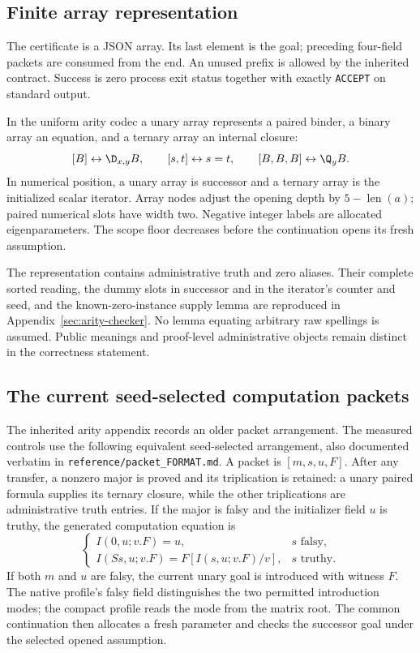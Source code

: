 \subsection{Finite array representation}

The certificate is a JSON array. Its last element is the goal; preceding
four-field packets are consumed from the end. An unused prefix is allowed
by the inherited contract. Success is zero process exit status together
with exactly \texttt{ACCEPT} on standard output.

In the uniform arity codec a unary array represents a paired binder,
a binary array an equation, and a ternary array an internal closure:
\[
 [B]\leftrightarrow\D_{x,y}B,\qquad
 [s,t]\leftrightarrow s=t,\qquad
 [B,B,B]\leftrightarrow\Q_yB.
\]
In numerical position, a unary array is successor and a ternary array is
the initialized scalar iterator. Array nodes adjust the opening depth by
$5-\operatorname{len}(a)$; paired numerical slots have width two.
Negative integer labels are allocated eigenparameters. The scope floor
decreases before the continuation opens its fresh assumption.

The representation contains administrative truth and zero aliases.
Their complete sorted reading, the dummy slots in successor and in the
iterator's counter and seed, and the known-zero-instance supply lemma
are reproduced in Appendix~\ref{sec:arity-checker}. No lemma equating
arbitrary raw spellings is assumed. Public meanings and proof-level
administrative objects remain distinct in the correctness statement.

\subsection{The current seed-selected computation packets}

The inherited arity appendix records an older packet arrangement. The
measured controls use the following equivalent seed-selected arrangement,
also documented verbatim in \texttt{reference/packet\_FORMAT.md}. A packet
is $[m,s,u,F]$. After any transfer, a nonzero major is proved and its
triplication is retained: a unary paired formula supplies its ternary
closure, while the other triplications are administrative truth entries.
If the major is falsy and the initializer field $u$ is truthy, the generated
computation equation is
\[
 \begin{cases}
 I(0,u;v.F)=u,&s\text{ falsy},\\
 I(Ss,u;v.F)=F[I(s,u;v.F)/v],&s\text{ truthy}.
 \end{cases}
\]
If both $m$ and $u$ are falsy, the current unary goal is introduced with
witness $F$. The native profile's falsy field distinguishes the two
permitted introduction modes; the compact profile reads the mode from
the matrix root. The common continuation then allocates a fresh parameter
and checks the successor goal under the selected opened assumption.


